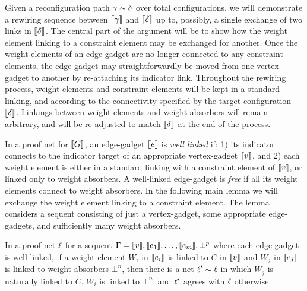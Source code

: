 \documentclass[conference]{IEEEtran}
\begin{document}
Given a reconfiguration path $\gamma\perm\delta$ over total configurations, we will demonstrate a rewiring sequence between $\llbracket\gamma\rrbracket$ and $\llbracket\delta\rrbracket$ up to, possibly, a single exchange of two links in $\llbracket\delta\rrbracket$.
%
The central part of the argument will be to show how the weight element linking to a constraint element may be exchanged for another.
%
Once the weight elements of an edge-gadget are no longer connected to any constraint elements, the edge-gadget may straightforwardly be moved from one vertex-gadget to another by re-attaching its indicator link.
%
Throughout the rewiring process, weight elements and constraint elements will be kept in a standard linking, and according to the connectivity specified by the target configuration $\llbracket\delta\rrbracket$.
%
Linkings between weight elements and weight absorbers will remain arbitrary, and will be re-adjusted to match $\llbracket\delta\rrbracket$ at the end of the process.



In a proof net for $\llbracket G\rrbracket$, an edge-gadget $\llbracket e\rrbracket$ is \emph{well linked} if: 1) its indicator connects to the indicator target of an appropriate vertex-gadget $\llbracket v\rrbracket$, and 2) each weight element is either in a standard linking with a constraint element of $\llbracket v\rrbracket$, or linked only to weight absorbers.
%
A well-linked edge-gadget is \emph{free} if all its weight elements connect to weight absorbers.
%
In the following main lemma we will exchange the weight element linking to a constraint element.
%
The lemma considers a sequent consisting of just a vertex-gadget, some appropriate edge-gadgets, and sufficiently many weight absorbers.


\begin{lemma}
\label{lem:octopus roll}
In a proof net $\ell$ for a sequent $\Gamma=\llbracket v\rrbracket,\llbracket e_1\rrbracket,\dotsc,\llbracket e_m\rrbracket,\bot^p$ where each edge-gadget is well linked, if a weight element $W_i$ in $\llbracket e_i\rrbracket$ is linked to $C$ in $\llbracket v\rrbracket$ and $W_j$ in $\llbracket e_j\rrbracket$ is linked to weight absorbers $\bot^n$, then there is a net $\links'\perm\links$ in which $W_j$ is naturally linked to $C$, $W_i$ is linked to $\bot^n$, and $\ell'$ agrees with $\ell$ otherwise.
\end{lemma}


\renewcommand\scalefactor{0.88}

\newcommand\displayOcto[1]{%
 \NoIndent{%
   \smallskip%
   \centerline{%
	 \scale{#1}%
  }}%
  \bigskip%
}
\end{document}
